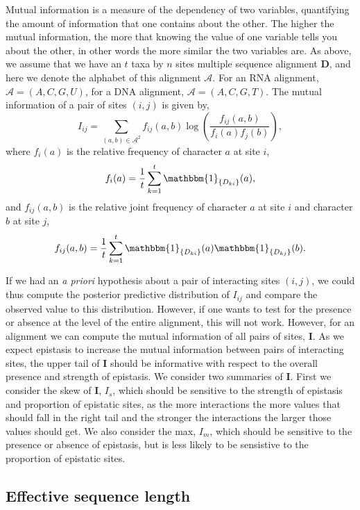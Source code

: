 \documentclass[11pt]{article}
\begin{document}
Mutual information is a measure of the dependency of two variables, quantifying the amount of information that one contains about the other.
The higher the mutual information, the more that knowing the value of one variable tells you about the other, in other words the more similar the two variables are.
As above, we assume that we have an $t$ taxa by $n$ sites multiple sequence alignment $\boldsymbol{D}$, and here we denote the alphabet of this alignment $\mathcal{A}$.
For an RNA alignment, $\mathcal{A} = (A,C,G,U)$, for a DNA alignment, $\mathcal{A} = (A,C,G,T)$.
The mutual information of a pair of sites $(i,j)$ is given by,
\[
I_{ij} = \sum_{(a,b)\in\mathcal{A}^2}f_{ij}(a,b)\log\left(\frac{f_{ij}(a,b)}{f_i(a)f_j(b)}\right),
\]
where $f_i(a)$ is the relative frequency of character $a$ at site $i$,
\[
f_i(a) = \frac{1}{t}\sum_{k=1}^{t}\mathbbm{1}_{\{D_{ki}\}}(a),
\]
and $f_{ij}(a,b)$ is the relative joint frequency of character $a$ at site $i$ and character $b$ at site $j$,
\[
f_{ij}(a,b) = \frac{1}{t}\sum_{k=1}^{t}\mathbbm{1}_{\{D_{ki}\}}(a) \mathbbm{1}_{\{D_{kj}\}}(b).
\]

If we had an \textit{a priori} hypothesis about a pair of interacting sites $(i,j)$, we could thus compute the posterior predictive distribution of $I_{ij}$ and compare the observed value to this distribution.
However, if one wants to test for the presence or absence at the level of the entire alignment, this will not work.
However, for an alignment we can compute the mutual information of all pairs of sites, $\boldsymbol{I}$.
As we expect epistasis to increase the mutual information between pairs of interacting sites, the upper tail of $\boldsymbol{I}$ should be informative with respect to the overall presence and strength of epistasis.
We consider two summaries of $\boldsymbol{I}$.
First we consider the skew of $\boldsymbol{I}$, $I_s$, which should be sensitive to the strength of epistasis and proportion of epistatic sites, as the more interactions the more values that should fall in the right tail and the stronger the interactions the larger those values should get.
We also consider the max, $I_m$, which should be sensitive to the presence or absence of epistasis, but is less likely to be sensistive to the proportion of epistatic sites.

\subsection{Effective sequence length}
\end{document}
